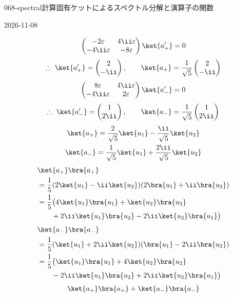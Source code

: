\documentclass[uplatex,dvipdfmx,a4paper,11pt]{jsarticle}
\begin{document}
\begin{mondai}{068-spectral}{計算}{固有ケットによるスペクトル分解と演算子の関数}
\begin{kotaeutsushi}{2026-11-08}
\begin{gather*}
\end{gather*}
\[ \begin{pmatrix}-2\varepsilon&4\ii\varepsilon\\-4\ii\varepsilon&-8\varepsilon\end{pmatrix}\ket{a_{+}'}=0 \]
\[ \therefore\ \ket{a_{+}'}=\begin{pmatrix}2\\-\ii\end{pmatrix},\qquad \ket{a_{+}}=\frac{1}{\sqrt{5}}\begin{pmatrix}2\\-\ii\end{pmatrix} \]
\[ \begin{pmatrix}8\varepsilon&4\ii\varepsilon\\-4\ii\varepsilon&2\varepsilon\end{pmatrix}\ket{a_{-}'}=0 \]
\[ \therefore\ \ket{a_{-}'}=\begin{pmatrix}1\\2\ii\end{pmatrix},\qquad \ket{a_{-}}=\frac{1}{\sqrt{5}}\begin{pmatrix}1\\2\ii\end{pmatrix} \]
\begin{gather*}
\ket{a_{+}}=\frac{2}{\sqrt{5}}\ket{u_{1}}-\frac{\ii}{\sqrt{5}}\ket{u_{2}}\\
\ket{a_{-}}=\frac{1}{\sqrt{5}}\ket{u_{1}}+\frac{2\ii}{\sqrt{5}}\ket{u_{2}}
\end{gather*}
\begin{align*}
&\ket{a_{+}}\bra{a_{+}}\\
&=\frac{1}{5}(2\ket{u_{1}}-\ii\ket{u_{2}})(2\bra{u_{1}}+\ii\bra{u_{2}})\\
&=\frac{1}{5}\bigl(4\ket{u_{1}}\bra{u_{1}}+\ket{u_{2}}\bra{u_{2}}\\
&\qquad+2\ii\ket{u_{1}}\bra{u_{2}}-2\ii\ket{u_{2}}\bra{u_{1}}\bigr)
\end{align*}
\begin{align*}
&\ket{a_{-}}\bra{a_{-}}\\
&=\frac{1}{5}(\ket{u_{1}}+2\ii\ket{u_{2}})(\bra{u_{1}}-2\ii\bra{u_{2}})\\
&=\frac{1}{5}\bigl(\ket{u_{1}}\bra{u_{1}}+4\ket{u_{2}}\bra{u_{2}}\\
&\qquad-2\ii\ket{u_{1}}\bra{u_{2}}+2\ii\ket{u_{2}}\bra{u_{1}}\bigr)
\end{align*}
\begin{align*}
&\ket{a_{+}}\bra{a_{+}}+\ket{a_{-}}\bra{a_{-}}\\

\end{align*}
\end{kotaeutsushi}
\end{mondai}
\end{document}

